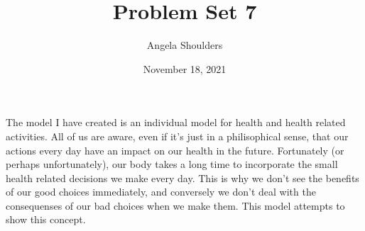 \documentclass{article}[12pt]
\begin{document}
\title{Problem Set 7}
\author{Angela Shoulders}
\date{November 18, 2021}

\maketitle

The model I have created is an individual model for health and health related activities.  All of us are aware, even if it's just in a philisophical sense, that our actions every day have an impact on our health in the future.  Fortunately (or perhaps unfortunately), our body takes a long time to incorporate the small health related decisions we make every day.  This is why we don't see the benefits of our good choices immediately, and conversely we don't deal with the consequenses of our bad choices when we make them.  This model attempts to show this concept.
\end{document}
